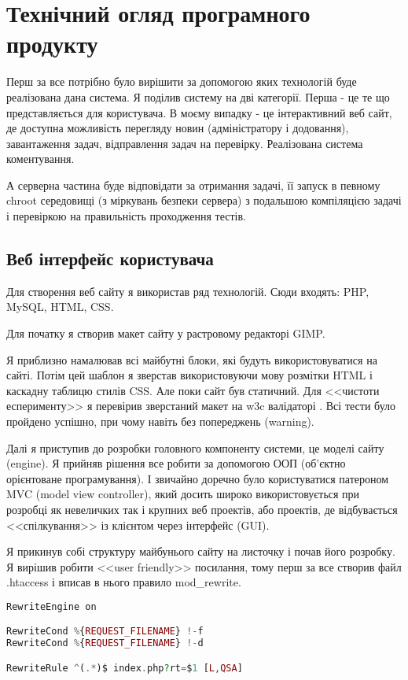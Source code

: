 \section{Технічний огляд програмного продукту}
Перш за все потрібно було вирішити за допомогою яких технологій буде реалізована дана система. Я поділив систему на дві категорії. Перша - це те що представляється для користувача. В моєму випадку - це інтерактивний веб сайт, де доступна можливість перегляду новин (адміністратору і додовання), завантаження задач, відправлення задач на перевірку. Реалізована система коментування.
\par А серверна частина буде відповідати за отримання задачі, її запуск в певному chroot середовищі (з міркувань безпеки сервера) з подальшою компіляцією задачі і перевіркою на правильність проходження тестів.

\subsection{Веб інтерфейс користувача}
Для створення веб сайту я використав ряд технологій. Сюди входять: PHP, MySQL, HTML, CSS. 
\par Для початку я створив макет сайту у растровому редакторі GIMP. 
\par Я приблизно намалював всі майбутні блоки, які будуть використовуватися на сайті. Потім цей шаблон я зверстав використовуючи мову розмітки HTML і каскадну таблицю стилів CSS. Але поки сайт був статичний. Для <<чистоти есперименту>> я перевірив зверстаний макет на w3c валідаторі \cite{w3c}. Всі тести було пройдено успішно, при чому навіть без попереджень (warning).
\par Далі я приступив до розробки головного компоненту системи, це моделі сайту (engine). Я прийняв рішення все робити за допомогою ООП (об'єктно орієнтоване програмування). І звичайно доречно було користуватися патероном MVC (model view controller), який досить широко використовується при розробці як невеличких так і крупних веб проектів, або проектів, де відбувається <<спілкування>> із клієнтом через інтерфейс (GUI).
\par Я прикинув собі структуру майбунього сайту на листочку і почав його розробку. Я вирішив робити <<user friendly>> посилання, тому перш за все створив файл .htaccess і вписав в нього правило mod\_rewrite.

\begin{lstlisting}[language=PHP]
RewriteEngine on

RewriteCond %{REQUEST_FILENAME} !-f
RewriteCond %{REQUEST_FILENAME} !-d

RewriteRule ^(.*)$ index.php?rt=$1 [L,QSA]
\end{lstlisting}

